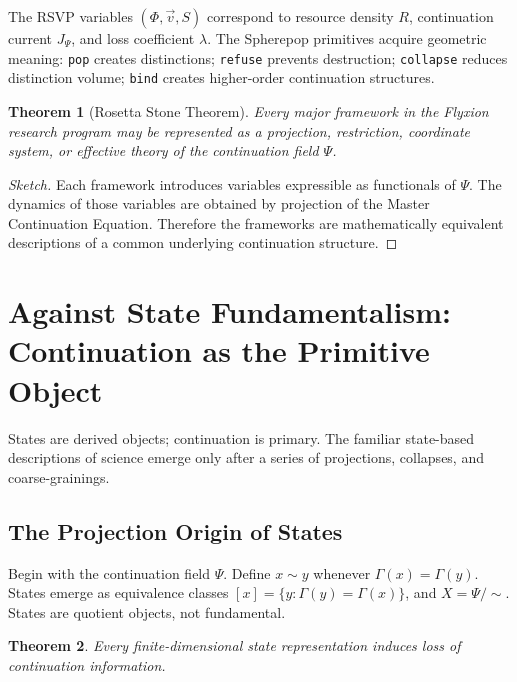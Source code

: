 \documentclass[12pt,a4paper]{article}
\newtheorem{theorem}{Theorem}[section]
\begin{document}
\medskip
\noindent The RSVP variables $(\Phi, \vec v, S)$ correspond to resource density $R$, continuation current $J_\Psi$, and loss coefficient $\lambda$. The Spherepop primitives acquire geometric meaning: \texttt{pop} creates distinctions; \texttt{refuse} prevents destruction; \texttt{collapse} reduces distinction volume; \texttt{bind} creates higher-order continuation structures.

\begin{theorem}[Rosetta Stone Theorem]
Every major framework in the Flyxion research program may be represented as a projection, restriction, coordinate system, or effective theory of the continuation field $\Psi$.
\end{theorem}

\begin{proof}[Sketch]
Each framework introduces variables expressible as functionals of $\Psi$. The dynamics of those variables are obtained by projection of the Master Continuation Equation. Therefore the frameworks are mathematically equivalent descriptions of a common underlying continuation structure.
\end{proof}

\section{Against State Fundamentalism: Continuation as the Primitive Object}

States are derived objects; continuation is primary. The familiar state-based descriptions of science emerge only after a series of projections, collapses, and coarse-grainings.

\subsection{The Projection Origin of States}

Begin with the continuation field $\Psi$. Define $x \sim y$ whenever $\Gamma(x) = \Gamma(y)$. States emerge as equivalence classes $[x] = \{ y : \Gamma(y) = \Gamma(x) \}$, and $X = \Psi/{\sim}$. States are quotient objects, not fundamental.

\begin{theorem}
Every finite-dimensional state representation induces loss of continuation information.
\end{theorem}
\end{document}
